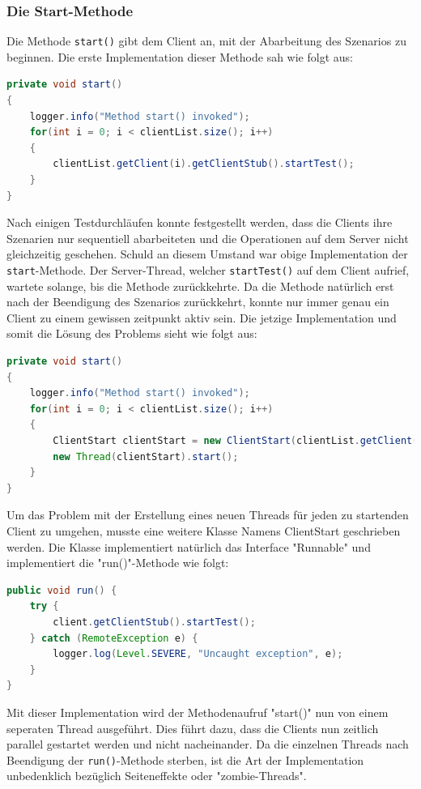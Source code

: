 \subsubsection{Die Start-Methode}
\label{sec:startMethode}

Die Methode \texttt{start()} gibt dem Client an, mit der Abarbeitung des Szenarios zu beginnen. Die erste Implementation dieser Methode sah wie folgt aus:
\begin{lstlisting}[language=java, breaklines=true]
private void start()
{
	logger.info("Method start() invoked");
	for(int i = 0; i < clientList.size(); i++)
	{
		clientList.getClient(i).getClientStub().startTest();
	}
}
\end{lstlisting}

Nach einigen Testdurchläufen konnte festgestellt werden, dass die Clients ihre Szenarien nur sequentiell abarbeiteten und die Operationen auf dem Server nicht gleichzeitig geschehen. Schuld an diesem Umstand war obige Implementation der \texttt{start}-Methode. Der Server-Thread, welcher \texttt{startTest()} auf dem Client aufrief, wartete solange, bis die Methode zurückkehrte. Da die Methode natürlich erst nach der Beendigung des Szenarios zurückkehrt, konnte nur immer genau ein Client zu einem gewissen zeitpunkt aktiv sein.\newline
Die jetzige Implementation und somit die Lösung des Problems sieht wie folgt aus:
\begin{lstlisting}[language=java, breaklines=true]
private void start()
{
	logger.info("Method start() invoked");
	for(int i = 0; i < clientList.size(); i++)
	{
		ClientStart clientStart = new ClientStart(clientList.getClient(i));
		new Thread(clientStart).start();
	}
}
\end{lstlisting}
Um das Problem mit der Erstellung eines neuen Threads für jeden zu startenden Client zu umgehen, musste eine weitere Klasse Namens ClientStart ge\-schrie\-ben wer\-den. Die Klas\-se im\-p\-le\-men\-tiert natür\-lich das Inter\-face "Run\-nable" und im\-p\-le\-men\-tiert die "run()"-Methode wie folgt:
\begin{lstlisting}[language=java, breaklines=true]
public void run() {
	try {
		client.getClientStub().startTest();
	} catch (RemoteException e) {
		logger.log(Level.SEVERE, "Uncaught exception", e);
	}
}
\end{lstlisting}

Mit dieser Implementation wird der Methodenaufruf "start()" nun von einem seperaten Thread ausgeführt. Dies führt dazu, dass die Clients nun zeitlich parallel gestartet werden und nicht nacheinander. Da die einzelnen Threads nach Beendigung der \texttt{run()}-Methode sterben, ist die Art der Implementation unbedenklich bezüglich Seiteneffekte oder "zombie-Threads".

